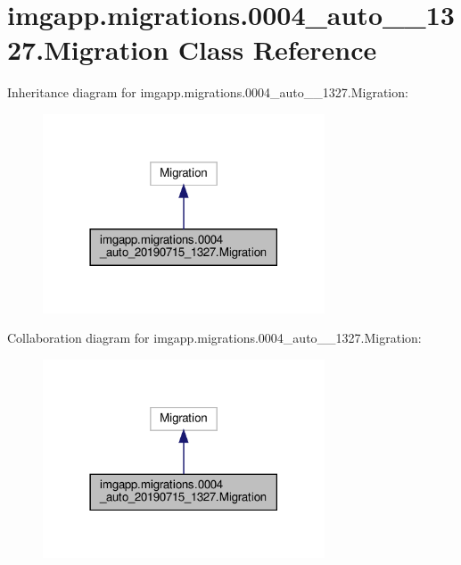 \hypertarget{classimgapp_1_1migrations_1_10004__auto__20190715__1327_1_1Migration}{}\section{imgapp.\+migrations.0004\+\_\+auto\+\_\+\_\+1327.Migration Class Reference}
\label{classimgapp_1_1migrations_1_10004__auto__20190715__1327_1_1Migration}


Inheritance diagram for imgapp.\+migrations.0004\+\_\+auto\+\_\+\_\+1327.Migration\+:
\nopagebreak
\begin{figure}[H]
\begin{center}
\leavevmode
\includegraphics[width=237pt]{classimgapp_1_1migrations_1_10004__auto__20190715__1327_1_1Migration__inherit__graph}
\end{center}
\end{figure}


Collaboration diagram for imgapp.\+migrations.0004\+\_\+auto\+\_\+\_\+1327.Migration\+:
\nopagebreak
\begin{figure}[H]
\begin{center}
\leavevmode
\includegraphics[width=237pt]{classimgapp_1_1migrations_1_10004__auto__20190715__1327_1_1Migration__coll__graph}
\end{center}
\end{figure}
